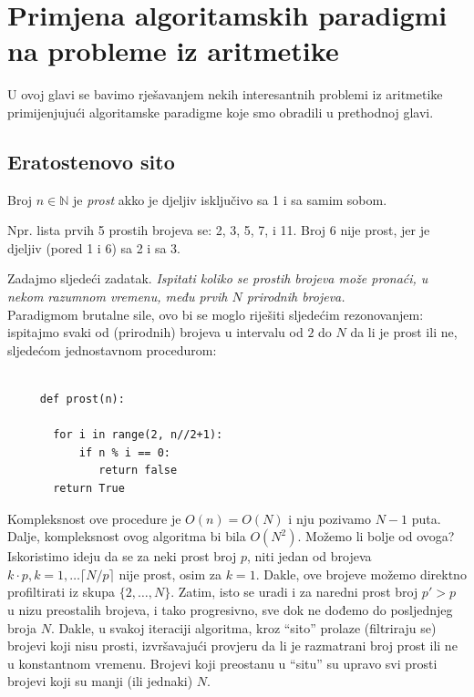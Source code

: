 \chapter{Primjena algoritamskih paradigmi na probleme iz aritmetike}


U ovoj glavi se bavimo rješavanjem nekih interesantnih problemi iz
aritmetike primijenjujući algoritamske paradigme koje smo obradili u prethodnoj glavi.

\section{Eratostenovo sito}

\begin{definition}
 	Broj $n \in \mathbb{N}$ je \textit{prost} akko je djeljiv isključivo sa 1 i sa samim sobom. 
\end{definition}

Npr. lista prvih 5 prostih brojeva se: 2, 3, 5, 7, i 11. Broj 6 nije prost, jer je djeljiv (pored 1 i 6) sa 2 i sa 3. 

Zadajmo sljedeći zadatak. \emph{
Ispitati koliko se prostih brojeva može pronaći,
u nekom razumnom vremenu, među prvih ${N}$ prirodnih brojeva.} \\ 


Paradigmom brutalne sile, ovo bi se moglo riješiti sljedećim rezonovanjem: ispitajmo svaki od (prirodnih) brojeva u intervalu od $2$ do ${N}$ da li je prost ili ne, sljedećom jednostavnom procedurom:

\begin{verbatim}
     
     def prost(n):
       
       for i in range(2, n//2+1):
           if n % i == 0:
              return false
       return True
\end{verbatim}
Kompleksnost ove procedure je $O(n)=O(N)$ i nju pozivamo $N-1$ puta. Dalje, kompleksnost ovog algoritma bi bila $O(N^2)$. Možemo  li bolje od ovoga? \\

 Iskoristimo ideju da se za neki prost broj $p$, niti jedan od brojeva $k\cdot p, k = 1, \ldots \lceil N/ p \rceil$ nije prost, osim za $k=1$. Dakle, ove brojeve možemo direktno profiltirati iz skupa $\{2, \ldots, N\}$. Zatim, isto se uradi  i za naredni prost broj $p' >p$ u nizu preostalih brojeva, i tako progresivno, sve dok ne dođemo do posljednjeg broja $N$. Dakle, u svakoj iteraciji algoritma, kroz ``sito'' prolaze (filtriraju se) brojevi koji nisu prosti, izvršavajući   provjeru da li je razmatrani broj prost ili ne u konstantnom vremenu. Brojevi koji preostanu u ``situ'' su upravo svi prosti brojevi koji su manji (ili jednaki) $N$.

